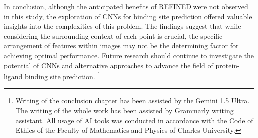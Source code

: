 In conclusion, although the anticipated benefits of REFINED were not observed in this study, the exploration of CNNs for binding site prediction offered valuable insights into the complexities of this problem. The findings suggest that while considering the surrounding context of each point is crucial, the specific arrangement of features within images may not be the determining factor for achieving optimal performance. Future research should continue to investigate the potential of CNNs and alternative approaches to advance the field of protein-ligand binding site prediction. \footnote{Writing of the conclusion chapter has been assisted by the Gemini 1.5 Ultra. The writing of the whole work has been assisted by \href{https://www.grammarly.com/premium}{Grammarly} writing assistant. All usage of AI tools was conducted in accordance with the Code of Ethics of the Faculty of Mathematics and Physics of Charles University.}
